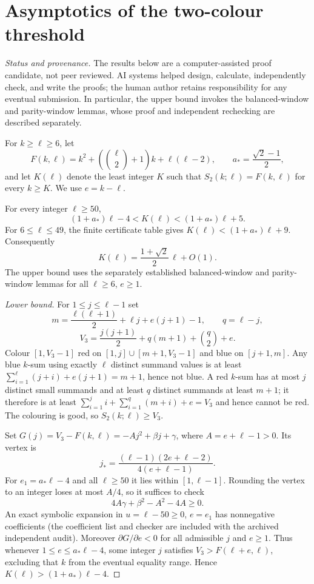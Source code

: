 \section{Asymptotics of the two-colour threshold}\label{sec:K-asymptotic}
\noindent\emph{Status and provenance.}
The results below are a computer-assisted proof candidate, not peer reviewed.
AI systems helped design, calculate, independently check, and write the proofs;
the human author retains responsibility for any eventual submission.
In particular, the upper bound invokes the balanced-window and parity-window
lemmas, whose proof and independent rechecking are described separately.

For $k\ge\ell\ge6$, let
\[
 F(k,\ell)=k^2+\left(\binom\ell2+1\right)k+\ell(\ell-2),
 \qquad a_* = \frac{\sqrt2-1}{2},
\]
and let $K(\ell)$ denote the least integer $K$ such that
$S_2(k;\ell)=F(k,\ell)$ for every $k\ge K$.
We use $e=k-\ell$.

\begin{theorem}\label{thm:K-asymptotic}
For every integer $\ell\ge50$,
\[
 (1+a_*)\ell-4 < K(\ell) < (1+a_*)\ell+5.
\]
For $6\le\ell\le49$, the finite certificate table gives
$K(\ell)<(1+a_*)\ell+9$.
Consequently
\[
 K(\ell)=\frac{1+\sqrt2}{2}\,\ell+O(1).
\]
The upper bound uses the separately established balanced-window and
parity-window lemmas for all $\ell\ge6$, $e\ge1$.
\end{theorem}

\begin{proof}[Lower bound]
For $1\le j\le\ell-1$ set
\[
 m=\frac{\ell(\ell+1)}2+\ell j+e(j+1)-1,
 \qquad q=\ell-j,
\]
\[
 V_3=\frac{j(j+1)}2+q(m+1)+\binom q2+e.
\]
Colour $[1,V_3-1]$ red on $[1,j]\cup[m+1,V_3-1]$ and blue on
$[j+1,m]$. Any blue $k$-sum using exactly $\ell$ distinct summand
values is at least
$\sum_{i=1}^\ell(j+i)+e(j+1)=m+1$, hence not blue.
A red $k$-sum has at most $j$ distinct small summands and at least
$q$ distinct summands at least $m+1$; it therefore is at least
$\sum_{i=1}^{j}i+\sum_{i=1}^{q}(m+i)+e=V_3$ and hence
cannot be red. The colouring is good, so $S_2(k;\ell)\ge V_3$.

Set $G(j)=V_3-F(k,\ell)=-Aj^2+\beta j+\gamma$,
where $A=e+\ell-1>0$. Its vertex is
\[
 j_*=\frac{(\ell-1)(2e+\ell-2)}{4(e+\ell-1)}.
\]
For $e_1=a_*\ell-4$ and all $\ell\ge50$ it lies within
$[1,\ell-1]$. Rounding the vertex to an integer loses at most
$A/4$, so it suffices to check
\[
 4A\gamma+\beta^2-A^2-4A\ge0.
\]
An exact symbolic expansion in $u=\ell-50\ge0$, $e=e_1$ has
nonnegative coefficients (the coefficient list and checker are
included with the archived independent audit). Moreover
$\partial G/\partial e<0$ for all admissible $j$ and $e\ge1$.
Thus whenever $1\le e\le a_*\ell-4$, some integer $j$ satisfies
$V_3>F(\ell+e,\ell)$, excluding that $k$ from the eventual equality
range. Hence $K(\ell)>(1+a_*)\ell-4$.
\end{proof}

